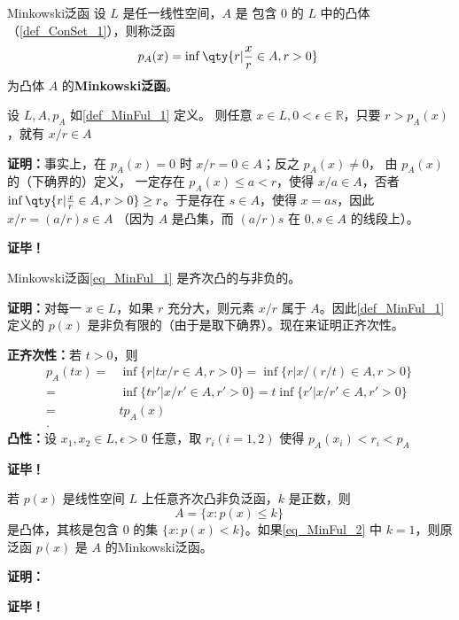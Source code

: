 

\begin{definition}{Minkowski泛函}\label{def_MinFul_1}
设 $L$ 是任一线性空间，$A$ 是 包含 0 的 $L$ 中的凸体（\autoref{def_ConSet_1}），则称泛函
\begin{equation}\label{eq_MinFul_1}
p_A(x)=\inf\qty{r|\frac{x}{r}\in A,r>0}~
\end{equation}
为凸体 $A$ 的\textbf{Minkowski泛函}。

\end{definition}

\begin{lemma}{}
设 $L,A,p_A$ 如\autoref{def_MinFul_1} 定义。 则任意 $x\in L,0<\epsilon\in\mathbb R$，只要 $r>p_A(x)$，就有 $x/r\in A$
\end{lemma}
\textbf{证明：}事实上，在 $p_A(x)=0$ 时 $x/r=0\in A$；反之 $p_A(x)\neq0$， 由 $p_A(x)$ 的（下确界的）定义， 一定存在 $p_A(x)\leq a<r$，使得 $x/a\in A$，否者$\inf\qty{r|\frac{x}{r}\in A,r>0}\geq r$。于是存在 $s\in A$，使得 $x=as$，因此 $x/r=(a/r)s\in A$ （因为 $A$ 是凸集，而 $(a/r)s$ 在 $0,s\in A$ 的线段上）。

\textbf{证毕！}

\begin{theorem}{}
Minkowski泛函\autoref{eq_MinFul_1} 是齐次凸的与非负的。
\end{theorem}

\textbf{证明：}对每一 $x\in L$，如果 $r$ 充分大，则元素 $x/r$ 属于 $A$。因此\autoref{def_MinFul_1} 定义的 $p(x)$ 是非负有限的（由于是取下确界）。现在来证明正齐次性。

\textbf{正齐次性：}若 $t>0$，则
\begin{equation}
\begin{aligned}
p_A(tx)=&\inf \{r|tx/r\in A,r>0\}=\inf \{r|x/(r/t)\in A,r>0\}\\
=&\inf \{tr'|x/r'\in A,r'>0\}=t\inf \{r'|x/r'\in A,r'>0\}\\
=&tp_A(x)\\.
\end{aligned}~
\end{equation}
\textbf{凸性：}设 $x_1,x_2\in L,\epsilon>0$ 任意，取 $r_i(i=1,2)$ 使得 $p_A(x_i)<r_i<p_A$








\textbf{证毕！}

\begin{theorem}{}
若 $p(x)$ 是线性空间 $L$ 上任意齐次凸非负泛函，$k$ 是正数，则
\begin{equation}\label{eq_MinFul_2}
A=\{x:p(x)\leq k\}~
\end{equation}
是凸体，其核是包含 $0$ 的集 $\{x:p(x)<k\}$。如果\autoref{eq_MinFul_2} 中 $k=1$，则原泛函 $p(x)$ 是 $A$ 的Minkowski泛函。
\end{theorem}

\textbf{证明：}




\textbf{证毕！}
